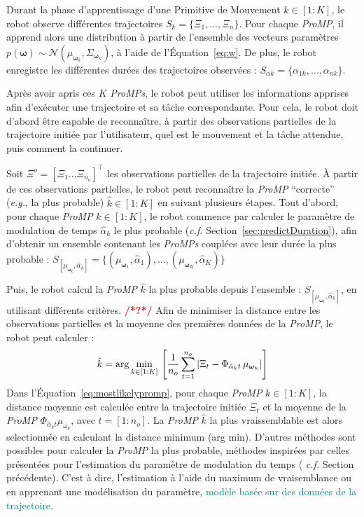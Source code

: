 \documentclass[utf8]{frontiersSCNS} %
\newcommand{\toimprove}[1]{\textcolor{teal}{#1}}
\newcommand{\todo}[1]{\textcolor{red}{\textbf{/*#1*/}}}
\begin{document}
Durant la phase d'apprentissage d'une Primitive de Mouvement $k \in [1:K]$,  le robot observe différentes trajectoires $S_k = \{\Xi_1,\ldots,\Xi_n\}$. Pour chaque \textit{ProMP}, il apprend alors une distribution à partir de l'ensemble des vecteurs paramètres  $p(\boldsymbol{\omega}) \sim \mathcal{N}(\mu_{\boldsymbol{\omega}_k}, \Sigma_{\boldsymbol{\omega}_k})$, à l'aide de l'Équation~\ref{eq:w}. De plus, le robot enregistre les différentes durées des trajectoires observées : $ S_{\alpha k} = \{\alpha_{1k},\ldots,\alpha_{nk}\}$.

Après avoir apris ces $K$ \textit{ProMPs}, le robot peut utiliser les informations apprises afin d’exécuter une trajectoire et sa tâche correspondante. Pour cela, le robot doit d'abord être capable de reconnaître, à partir des observations partielles de la trajectoire initiée par l'utilisateur, quel est le mouvement et la tâche attendue, puis comment la continuer.

Soit $\Xi^{o} = [\Xi_1 \ldots \Xi_{n_o}]^\top$ les observations partielles de la trajectoire initiée.
À partir de ces observations partielles, le robot peut reconnaître la \textit{ProMP} ``correcte'' (\textit{e.g.}, la plus probable) $\hat{k} \in [1:K]$ en suivant plusieurs étapes.
Tout d'abord, pour chaque \textit{ProMP} $k \in [1:K]$, le robot commence par calculer le paramètre de modulation de temps $\hat{\alpha}_k$ le plus probable (\textit{c.f.} Section~\ref{sec:predictDuration}), afin d'obtenir un ensemble contenant les \textit{ProMPs} couplées avec leur durée la plus probable : $S_{[\mu_{\boldsymbol{\omega}_k}, \hat{\alpha}_k]} = \{(\mu_{\boldsymbol{\omega}_1},\hat{\alpha}_1),\ldots,(\mu_{\boldsymbol{\omega}_K},\hat{\alpha}_K)\}$

Puis, le robot calcul la \textit{ProMP} $\hat{k}$ la plus probable depuis l'ensemble : $S_{[\mu_{\boldsymbol{\omega}_k}, \hat{\alpha}_k]}$, en utilisant différents critères. \todo{?}
Afin de minimiser la distance entre les observations partielles et la moyenne des premières données de la \textit{ProMP}, le robot peut calculer :
\begin{equation} \label{eq:mostlikelypromp}
\hat{k} = \arg \min_{k \in [1:K]} \,   \left[      {1 \over n_o} \sum_{t=1}^{n_o}| \Xi_{t} - \Phi_{\hat{\alpha}_k t} \, \mu_{\boldsymbol{\omega}_k} | \right]
\end{equation}
Dans l'Équation~\ref{eq:mostlikelypromp}, pour chaque \textit{ProMP}  $k \in [1:K]$, la distance moyenne est calculée entre la trajectoire initiée $\Xi_t$  et la moyenne de la \textit{ProMP} $\Phi_{\hat{\alpha}_k t} \mu_{\omega_k}$, avec $t = [1:n_o]$.
La \textit{ProMP} $\hat{k}$ la plus vraissemblable est alors selectionnée en calculant la distance minimum (arg min). D'autres méthodes sont possibles pour calculer la \textit{ProMP} la plus probable, méthodes inspirées par celles présentées pour l'estimation du paramètre de modulation du temps ( \textit{c.f.} Section précédente). C'est à dire, l'estimation à l'aide du maximum de vraisemblance ou en apprenant une modélisation du paramètre, \toimprove{modèle basée sur des données de la trajectoire}.
\end{document}
